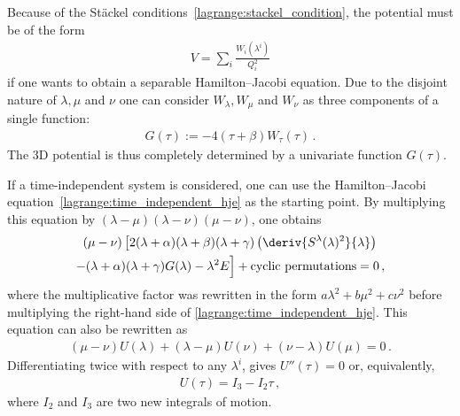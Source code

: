     Because of the St\"ackel conditions~\eqref{lagrange:stackel_condition}, the potential must be of the form
    \begin{gather}
        V = \sum_i\frac{W_i(\lambda^i)}{Q_i^2}
    \end{gather}
    if one wants to obtain a separable Hamilton--Jacobi equation. Due to the disjoint nature of $\lambda,\mu$ and $\nu$ one can consider $W_\lambda,W_\mu$ and $W_\nu$ as three components of a single function:
    \begin{gather}
        G(\tau) := -4(\tau+\beta)W_\tau(\tau)\,.
    \end{gather}
    The 3D potential is thus completely determined by a univariate function $G(\tau)$.

    If a time-independent system is considered, one can use the Hamilton--Jacobi equation~\eqref{lagrange:time_independent_hje} as the starting point. By multiplying this equation by $(\lambda - \mu)(\lambda - \nu)(\mu - \nu)$, one obtains
    \begin{multline}
        (\mu - \nu)\left[2(\lambda + \alpha)(\lambda + \beta)(\lambda + \gamma)\left(\deriv{S^\lambda(\lambda)^2}{\lambda}\right)\right.\\ - (\lambda + \alpha)(\lambda + \gamma)G(\lambda) - \lambda^2E \Bigr] + \text{cyclic permutations} = 0\,,
    \end{multline}
    where the multiplicative factor was rewritten in the form $a\lambda^2 + b\mu^2 + c\nu^2$ before multiplying the right-hand side of \cref{lagrange:time_independent_hje}. This equation can also be rewritten as
    \begin{gather}
        (\mu-\nu)U(\lambda) + (\lambda-\mu)U(\nu) + (\nu-\lambda)U(\mu) = 0\,.
    \end{gather}
    Differentiating twice with respect to any $\lambda^i$, gives $U''(\tau) = 0$ or, equivalently,
    \begin{gather}
        U(\tau) = I_3 - I_2\tau\,,
    \end{gather}
    where $I_2$ and $I_3$ are two new integrals of motion.


